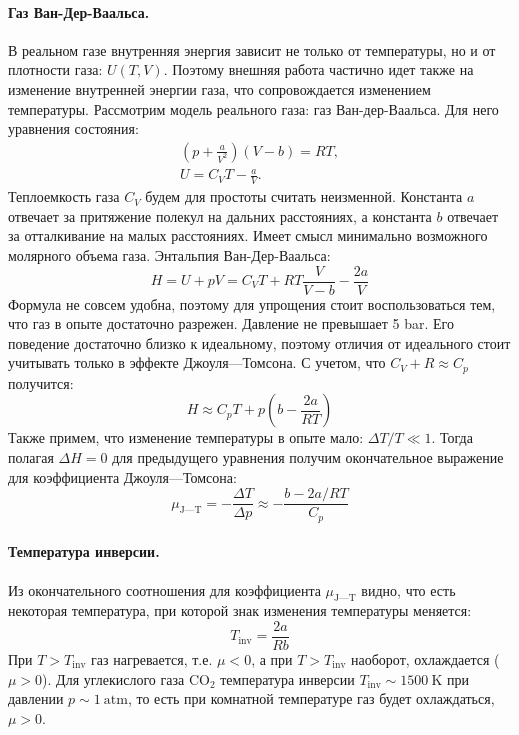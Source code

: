\documentclass[a4paper,12pt]{report}
\begin{document}
\begin{multicols}{2}
        \paragraph*{Газ Ван-Дер-Ваальса.} В реальном газе внутренняя энергия зависит не только от температуры, но и от плотности газа: $U(T,V)$. Поэтому внешняя работа частично идет также на изменение внутренней энергии газа, что сопровождается изменением температуры. Рассмотрим модель реального газа: газ Ван-дер-Ваальса. Для него уравнения состояния:
        \begin{gather*}
            \left(p+\frac{a}{V^2}\right)(V-b)=RT,\\ 
            U=C_V T - \frac{a}{V}.
        \end{gather*}  
        Теплоемкость газа $C_V$ будем для простоты считать неизменной. Константа $a$ отвечает за притяжение полекул на дальних расстояниях, а константа $b$ отвечает за отталкивание на малых расстояниях. Имеет смысл минимально возможного молярного объема газа. Энтальпия Ван-Дер-Ваальса:
        \begin{equation}
            H=U+pV=C_V T + RT \frac{V}{V-b}-\frac{2a}{V}
        \end{equation}
        Формула не совсем удобна, поэтому для упрощения стоит воспользоваться тем, что газ в опыте достаточно разрежен. Давление не превышает 5 bar. Его поведение достаточно близко к идеальному, поэтому отличия от идеального стоит учитывать только в эффекте Джоуля---Томсона. С учетом, что $C_V+R\approx C_p$ получится:
        \begin{equation}
            H \approx C_p T + p \left(b-\frac{2a}{RT}\right)
        \end{equation}
        Также примем, что изменение температуры в опыте мало: $\Delta T/T \ll 1$. Тогда полагая $\Delta H = 0$ для предыдущего уравнения получим окончательное выражение для коэффициента Джоуля---Томсона:
        \begin{equation}
            \label{j-tfinal}
            \mu_{\text{J---T}}=-\frac{\Delta T}{\Delta p}\approx -\frac{b-2a/RT}{C_p}
        \end{equation}
        \paragraph*{Температура инверсии.} Из окончательного соотношения для коэффициента $\mu_{\text{J---T}}$ видно, что есть некоторая температура, при которой знак изменения температуры меняется:
        \begin{equation*}
            T_\text{inv}=\frac{2a}{Rb}
        \end{equation*}
        При $T>T_\text{inv}$ газ нагревается, т.е. $\mu < 0$, а при $T>T_\text{inv}$ наоборот, охлаждается ($\mu > 0$). Для углекислого газа $\text{CO}_2$ температура инверсии $T_\text{inv}\sim 1500\ \text{K}$ при давлении $p \sim 1 \ \text{atm}$, то есть при комнатной температуре газ будет охлаждаться, $\mu > 0$.
    \end{multicols}
    \newpage
\end{document}
